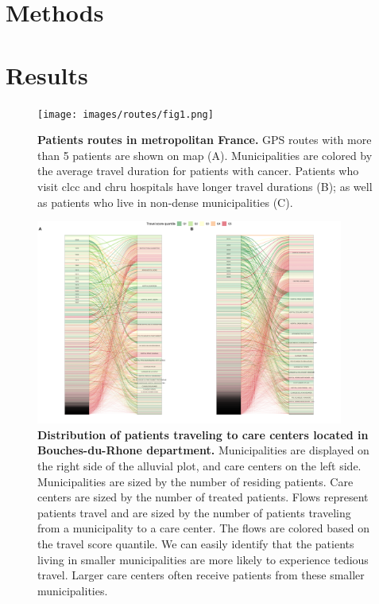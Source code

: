 \section{Methods}

\section{Results}

\begin{figure}[H]
    \texttt{[image: images/routes/fig1.png]}
    \centering
    \caption{
        \textbf{Patients routes in metropolitan France.} GPS routes with more than 5 patients are shown on map (A). Municipalities are colored by the average travel duration for patients with cancer. Patients who visit \ac{clcc} and \ac{chru} hospitals have longer travel durations (B); as well as patients who live in non-dense municipalities (C).
    }
    \label{fig:routes-duration-france}
\end{figure}

\begin{figure}[H]
    \includegraphics[width=0.9\textwidth]{images/routes/fig6.png}
    \centering
    \caption{
        \textbf{Distribution of patients traveling to care centers located in Bouches-du-Rhone department.} Municipalities are displayed on the right side of the alluvial plot, and care centers on the left side. Municipalities are sized by the number of residing patients. Care centers are sized by the number of treated patients. Flows represent patients travel and are sized by the number of patients traveling from a municipality to a care center. The flows are colored based on the travel score quantile. We can easily identify that the patients living in smaller municipalities are more likely to experience tedious travel. Larger care centers often receive patients from these smaller municipalities.
    }
    \label{fig:routes-alluvial-13}
\end{figure}

